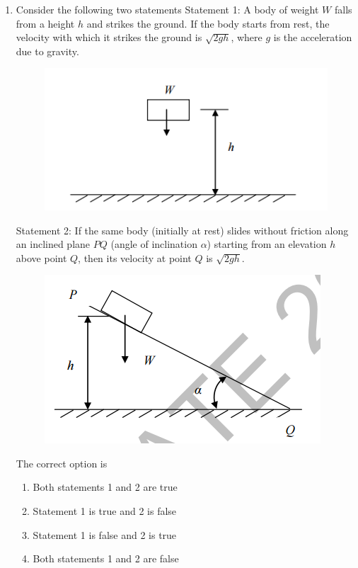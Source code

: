 \documentclass[a4paper,10pt]{article}
\begin{document}
\begin{enumerate}
    \hfill{}
    \begin{enumerate}
    \end{enumerate}

    \item Consider the following two statements
    Statement 1: A body of weight $W$ falls from a height $h$ and strikes the ground. If the body starts from rest, the velocity with which it strikes the ground is $\sqrt{2gh}$, where $g$ is the acceleration due to gravity.
    \begin{figure}[H] \centering \includegraphics[width=0.3\columnwidth]{q9_solid_1.png} \caption*{} \label{fig:q9_solid_1} \end{figure}
    Statement 2: If the same body (initially at rest) slides without friction along an inclined plane $PQ$ (angle of inclination $\alpha$) starting from an elevation $h$ above point $Q$, then its velocity at point $Q$ is $\sqrt{2gh}$.
    \begin{figure}[H] \centering \includegraphics[width=0.4\columnwidth]{q9_solid_2.png} \caption*{} \label{fig:q9_solid_2} \end{figure}
    The correct option is
    
    \hfill{}
    \begin{enumerate}
        \item Both statements 1 and 2 are true
        \item Statement 1 is true and 2 is false
        \item Statement 1 is false and 2 is true
        \item Both statements 1 and 2 are false
    \end{enumerate}


\end{enumerate}
\end{document}
